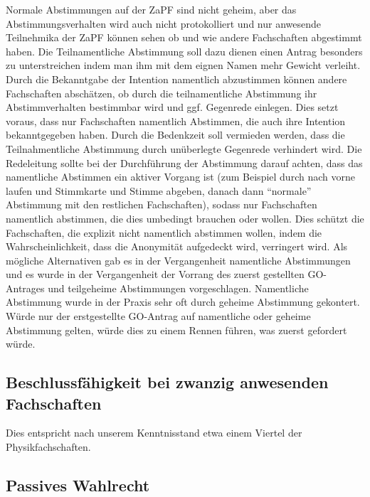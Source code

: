 \documentclass[
  a4paper,
  oneside]{scrartcl}
\begin{document}
Normale Abstimmungen auf der ZaPF sind nicht geheim, aber das
Abstimmungsverhalten wird auch nicht protokolliert und nur anwesende Teilnehmika
der ZaPF können sehen ob und wie andere Fachschaften abgestimmt haben.
Die Teilnamentliche Abstimmung soll dazu dienen einen Antrag besonders zu
unterstreichen indem man ihm mit dem eignen Namen mehr Gewicht verleiht.
Durch die Bekanntgabe der Intention namentlich abzustimmen können andere Fachschaften
abschätzen, ob durch die teilnamentliche Abstimmung ihr Abstimmverhalten bestimmbar
wird und ggf. Gegenrede einlegen. Dies setzt voraus, dass nur Fachschaften namentlich
Abstimmen, die auch ihre Intention bekanntgegeben haben.
Durch die Bedenkzeit soll vermieden werden, dass die Teilnahmentliche Abstimmung durch
unüberlegte Gegenrede verhindert wird.
Die Redeleitung sollte bei der Durchführung der Abstimmung darauf achten, dass das
namentliche Abstimmen ein aktiver Vorgang ist (zum Beispiel durch nach vorne laufen
und Stimmkarte und Stimme abgeben, danach dann “normale” Abstimmung mit den restlichen
Fachschaften), sodass nur Fachschaften namentlich abstimmen, die dies umbedingt brauchen
oder wollen. Dies schützt die Fachschaften, die explizit nicht namentlich abstimmen wollen,
indem die Wahrscheinlichkeit, dass die Anonymität aufgedeckt wird, verringert wird.
Als mögliche Alternativen gab es in der Vergangenheit namentliche Abstimmungen und es
wurde in der Vergangenheit der Vorrang des zuerst gestellten GO-Antrages und teilgeheime
Abstimmungen vorgeschlagen. Namentliche Abstimmung wurde in der Praxis sehr oft durch geheime
Abstimmung gekontert. Würde nur der erstgestellte GO-Antrag auf namentliche oder
geheime Abstimmung gelten, würde dies zu einem Rennen führen, was zuerst gefordert würde.

\subsection*{Beschlussfähigkeit bei zwanzig anwesenden
Fachschaften}\label{beschlussfuxe4higkeit-bei-zwanzig-anwesenden-fachschaften}

Dies entspricht nach unserem Kenntnisstand etwa einem Viertel der
Physikfachschaften.

\subsection*{Passives Wahlrecht}\label{passives-wahlrecht}
\end{document}
